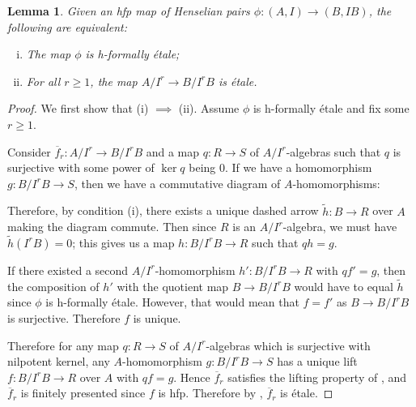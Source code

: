 \documentclass[12pt]{article}
\newcommand{\ol}[1]{\overline{#1}}
\newcommand{\Et}{\'etale\xspace}
\newcommand{\hfp}{hfp\xspace}
\newcommand{\hfetale}{h-formally \'etale\xspace}
\newtheorem{lemma}[theorem]{Lemma}
\theoremstyle{definition}
\numberwithin{equation}{subsection}
\begin{document}
\begin{lemma}\label{lem:finet} Given an \hfp map of Henselian pairs $\phi:(A,I) \to (B,IB)$, the following are equivalent:

\begin{enumerate}[(i)]
\item The map $\phi$ is \hfetale;
\item For all $r \ge 1$, the map $A/I^r \to B/I^rB$ is \Et.
\end{enumerate}

\end{lemma}
\begin{proof} 

We first show that (i) $\implies$ (ii). Assume $\phi$ is \hfetale and fix some $r \ge 1$. 

Consider $\ol{f}_r: A/I^r \to B/I^rB$ and a map $q: R \to S$ of $A/I^r$-algebras such that $q$ is surjective with some power of $\ker q$ being $0$. If we have a homomorphism $g: B/I^rB \to S$, then we have a commutative diagram of $A$-homomorphisms:

\begin{center}
\end{center} \vspace{-.25in}


Therefore, by condition (i), there exists a unique dashed arrow $\widetilde{h}: B \to R$ over $A$ making the diagram commute. Then since $R$ is an $A/I^r$-algebra, we must have $\widetilde{h}(I^rB)=0$; this gives us a map $h: B/I^rB \to R$ such that $qh=g$. 

If there existed a second $A/I^r$-homomorphism $h': B/I^rB \to R$ with $qf'=g$, then the composition of $h'$ with the quotient map $B \to B/I^rB$ would have to equal $\widetilde{h}$ since $\phi$ is \hfetale. However, that would mean that $f=f'$ as $B \to B/I^rB$ is surjective. Therefore $f$ is unique.

Therefore for any map $q: R \to S$ of $A/I^r$-algebras which is surjective with nilpotent kernel, any $A$-homomorphism $g: B/I^rB \to S$ has a unique lift $f: B/I^rB \to R$ over $A$ with $qf=g$. Hence $\ol{f}_r$ satisfies the lifting property of \cite[Definition 19.10.2]{ega41}, and $\ol{f}_r$ is finitely presented since $f$ is \hfp. Therefore by \cite[Theorem 17.6.1]{ega44}, $\ol{f}_r$ is \Et. 


\end{proof}
\end{document}
